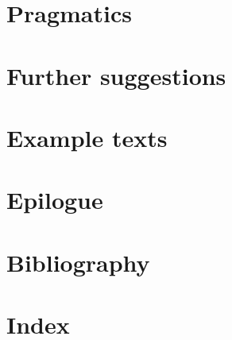 \documentclass[twoside, openany, 12pt, a5paper]{book}
\begin{document}
\chapter{Pragmatics}

\chapter{Further suggestions}

\chapter{Example texts}

\backmatter

\chapter{Epilogue}

\chapter{Bibliography}

\chapter{Index}


\end{document}
